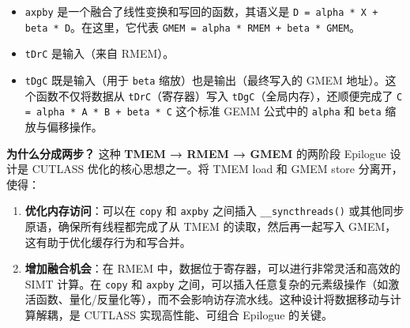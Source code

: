 \begin{itemize}
\item \texttt{axpby} 是一个融合了线性变换和写回的函数，其语义是 \texttt{D = alpha * X + beta * D}。在这里，它代表 \texttt{G\allowbreak{}M\allowbreak{}E\allowbreak{}M\allowbreak{} \allowbreak{}=\allowbreak{} \allowbreak{}a\allowbreak{}l\allowbreak{}p\allowbreak{}h\allowbreak{}a\allowbreak{} \allowbreak{}*\allowbreak{} \allowbreak{}R\allowbreak{}M\allowbreak{}E\allowbreak{}M\allowbreak{} \allowbreak{}+\allowbreak{} \allowbreak{}b\allowbreak{}e\allowbreak{}t\allowbreak{}a\allowbreak{} \allowbreak{}*\allowbreak{} \allowbreak{}G\allowbreak{}M\allowbreak{}E\allowbreak{}M}。
\item \texttt{t\allowbreak{}Dr\allowbreak{}C} 是输入（来自 RMEM）。
\item \texttt{t\allowbreak{}Dg\allowbreak{}C} 既是输入（用于 \texttt{beta} 缩放）也是输出（最终写入的 GMEM 地址）。这个函数不仅将数据从 \texttt{t\allowbreak{}Dr\allowbreak{}C}（寄存器）写入 \texttt{t\allowbreak{}Dg\allowbreak{}C}（全局内存），还顺便完成了 \texttt{C\allowbreak{} \allowbreak{}=\allowbreak{} \allowbreak{}a\allowbreak{}l\allowbreak{}p\allowbreak{}h\allowbreak{}a\allowbreak{} \allowbreak{}*\allowbreak{} \allowbreak{}A\allowbreak{} \allowbreak{}*\allowbreak{} \allowbreak{}B\allowbreak{} \allowbreak{}+\allowbreak{} \allowbreak{}b\allowbreak{}e\allowbreak{}t\allowbreak{}a\allowbreak{} \allowbreak{}*\allowbreak{} \allowbreak{}C} 这个标准 GEMM 公式中的 \texttt{alpha} 和 \texttt{beta} 缩放与偏移操作。
\end{itemize}

\textbf{为什么分成两步？} 这种 \textbf{TMEM → RMEM → GMEM} 的两阶段 Epilogue 设计是 CUTLASS 优化的核心思想之一。将 TMEM load 和 GMEM store 分离开，使得：

\begin{enumerate}
\item \textbf{优化内存访问}：可以在 \texttt{copy} 和 \texttt{axpby} 之间插入 \texttt{\_\allowbreak{}\_\allowbreak{}syncthreads()} 或其他同步原语，确保所有线程都完成了从 TMEM 的读取，然后再一起写入 GMEM，这有助于优化缓存行为和写合并。
\item \textbf{增加融合机会}：在 RMEM 中，数据位于寄存器，可以进行非常灵活和高效的 SIMT 计算。在 \texttt{copy} 和 \texttt{axpby} 之间，可以插入任意复杂的元素级操作（如激活函数、量化/\allowbreak{}反量化等），而不会影响访存流水线。这种设计将数据移动与计算解耦，是 CUTLASS 实现高性能、可组合 Epilogue 的关键。
\end{enumerate}


